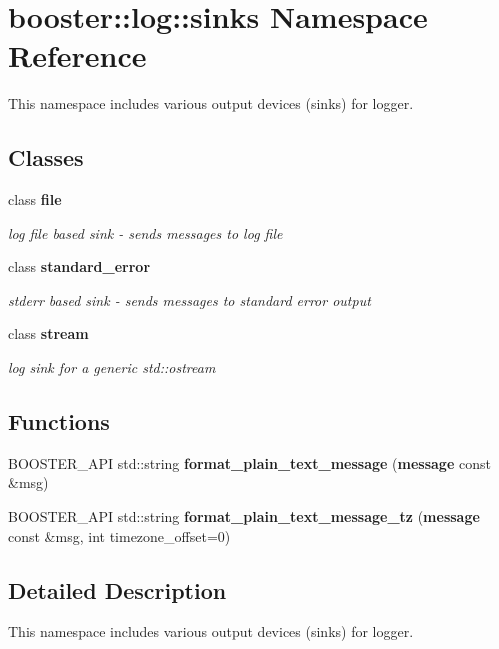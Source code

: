 \section{booster\+:\+:log\+:\+:sinks Namespace Reference}
\label{namespacebooster_1_1log_1_1sinks}


This namespace includes various output devices (sinks) for logger.  


\subsection*{Classes}
\begin{DoxyCompactItemize}
\item 
class {\bf file}
\begin{DoxyCompactList}\small\item\em log file based sink -\/ sends messages to log file \end{DoxyCompactList}\item 
class {\bf standard\+\_\+error}
\begin{DoxyCompactList}\small\item\em stderr based sink -\/ sends messages to standard error output \end{DoxyCompactList}\item 
class {\bf stream}
\begin{DoxyCompactList}\small\item\em log sink for a generic std\+::ostream \end{DoxyCompactList}\end{DoxyCompactItemize}
\subsection*{Functions}
\begin{DoxyCompactItemize}
\item 
B\+O\+O\+S\+T\+E\+R\+\_\+\+A\+PI std\+::string {\bf format\+\_\+plain\+\_\+text\+\_\+message} ({\bf message} const \&msg)
\item 
B\+O\+O\+S\+T\+E\+R\+\_\+\+A\+PI std\+::string {\bf format\+\_\+plain\+\_\+text\+\_\+message\+\_\+tz} ({\bf message} const \&msg, int timezone\+\_\+offset=0)
\end{DoxyCompactItemize}


\subsection{Detailed Description}
This namespace includes various output devices (sinks) for logger. 

